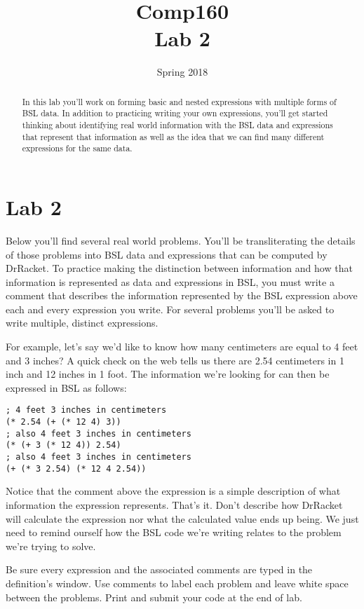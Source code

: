 \documentclass[nobib]{tufte-handout}
\title{Comp160 \\ Lab 2 }
\author{}
\date{ Spring 2018 }
\begin{document}
\maketitle

\begin{abstract}
In this lab you'll work on forming basic and nested  expressions with multiple forms of BSL data. In addition to practicing writing your own expressions, you'll get started thinking about identifying real world information with the BSL data and expressions that represent that information as well as the idea that we can find many different expressions for the same data.
\end{abstract}

\section{Lab 2}

Below you'll find several real world problems. You'll be transliterating the details of those problems into BSL data and expressions that can be computed by DrRacket. To practice making the distinction between information and how that information is represented as data and expressions in BSL, you must write a comment that describes the information represented by the BSL expression above each and every expression you write.  For several problems you'll be asked to write multiple, distinct expressions.

For example, let's say we'd like to know how many centimeters are equal to 4 feet and 3 inches?  A quick check on the web tells us there are 2.54 centimeters in 1 inch and 12 inches in 1 foot.  The information we're looking for can then be expressed in BSL as follows:

\begin{lstlisting}
; 4 feet 3 inches in centimeters
(* 2.54 (+ (* 12 4) 3))
; also 4 feet 3 inches in centimeters
(* (+ 3 (* 12 4)) 2.54)
; also 4 feet 3 inches in centimeters
(+ (* 3 2.54) (* 12 4 2.54))
\end{lstlisting}

Notice that the comment above the expression is a simple description of what information the expression represents.  That's it. Don't describe how DrRacket will calculate the expression nor what the calculated value ends up being. We just need to remind ourself how the BSL code we're writing relates to the problem we're trying to solve.

Be sure every expression and the associated comments are typed in the definition's window. Use comments to label each problem and leave white space between the problems. Print and submit your code at the end of lab.
\end{document}
